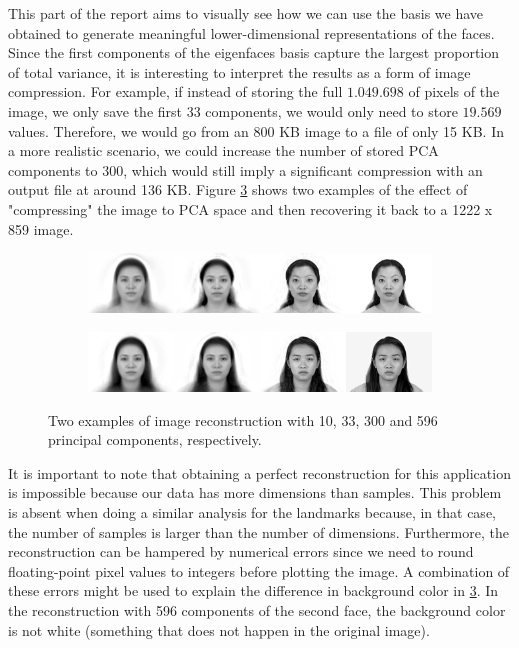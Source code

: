 \documentclass{article}
\begin{document}
This part of the report aims to visually see how we can use the basis we have obtained to generate meaningful lower-dimensional representations of the faces. Since the first components of the eigenfaces basis capture the largest proportion of total variance, it is interesting to interpret the results as a form of image compression. For example, if instead of storing the full $1.049.698$ of pixels of the image, we only save the first 33 components, we would only need to store $19.569$ values. Therefore, we would go from an 800 KB image to a file of only 15 KB. In a more realistic scenario, we could increase the number of stored PCA components to 300, which would still imply a significant compression with an output file at around 136 KB. Figure \ref{fig:reconstructed_images} shows two examples of the effect of "compressing" the image to PCA space and then recovering it back to a 1222 x 859 image.

\begin{figure}[H]
    \centering

    \begin{subfigure}{0.7\textwidth}
        \centering
        \includegraphics[width=\linewidth]{images/reconstructed_1.jpg}
        \label{fig:reconstructed_1}
    \end{subfigure}
    \begin{subfigure}{0.7\textwidth}
        \centering
        \includegraphics[width=\linewidth]{images/reconstructed_2.jpg}
        \label{fig:reconstrued_2}
    \end{subfigure}

    \caption{Two examples of image reconstruction with 10, 33, 300 and 596 principal components, respectively.}
    \label{fig:reconstructed_images}
\end{figure}

It is important to note that obtaining a perfect reconstruction for this application is impossible because our data has more dimensions than samples. This problem is absent when doing a similar analysis for the landmarks because, in that case, the number of samples is larger than the number of dimensions. Furthermore, the reconstruction can be hampered by numerical errors since we need to round floating-point pixel values to integers before plotting the image. A combination of these errors might be used to explain the difference in background color in \ref{fig:reconstructed_images}. In the reconstruction with 596 components of the second face, the background color is not white (something that does not happen in the original image).
\end{document}
